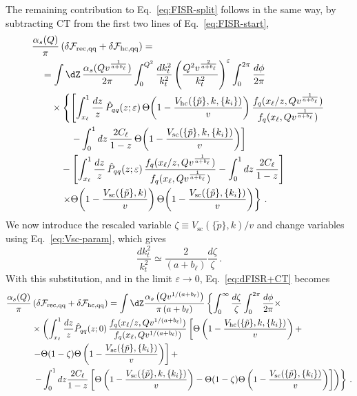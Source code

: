 The remaining contribution to Eq.~\eqref{eq:FISR-split} follows in the
same way, by subtracting $\mathrm{CT}$ from the first two lines of
Eq.~\eqref{eq:FISR-start},
\begin{align}
&\frac{\alpha_s(Q)}{\pi}\left(\delta \mathcal{F}_{\mathrm{rec,qq}}+\delta \mathcal{F}_{\mathrm{hc,qq}}\right)=\nonumber\\
&\quad=\int \dZ\,
  \frac{\alpha_s(Qv^{\frac{1}{a+b_\ell}})}{2\pi} \int_0^{Q^2}\frac{dk_t^2}{k_t^2}
\left(\frac{Q^2v^{\frac{2}{a+b_\ell}}}{k_t^2}\right)^{\varepsilon} \int_0^{2\pi}\frac{d\phi}{2\pi}\nonumber\\
&\qquad\times \left\{\left[\int_{x_\ell}^1 \frac{dz}{z}\,
\hat P_{qq}(z;\varepsilon)\,
\Theta\!\left(1-\frac{V_{\mathrm{hc}}(\{\tilde{p}\},k,\{k_i\})}{v}\right)
\frac{f_q(x_\ell/z,Qv^{\frac{1}{a+b_\ell}})}{f_q(x_\ell,Qv^{\frac{1}{a+b_\ell}})}\right.\right.\nonumber\\
&\qquad\qquad\left.
  - \int_0^1 dz\, \frac{2C_\ell}{1-z}\,
\Theta\!\left(1-\frac{V_{\mathrm{sc}}(\{\tilde{p}\},k,\{k_i\})}{v}\right)\right]\nonumber\\
&\qquad\quad-\left[\int_{x_\ell}^1\frac{dz}{z}\, \hat P_{qq}(z;\varepsilon)\,
\frac{f_q(x_\ell/z,Qv^{\frac{1}{a+b_\ell}})}{f_q(x_\ell,Qv^{\frac{1}{a+b_\ell}})}
-\int_0^1dz\,\frac{2 C_\ell}{1-z}\right]\nonumber\\
&\qquad\quad\left.\times\Theta\!\left(1-\frac{V_{\mathrm{sc}}(\{\tilde{p}\},k)}{v}\right)
\Theta\!\left(1-\frac{V_{\mathrm{sc}}(\{\tilde{p}\},\{k_i\})}{v}\right)
\right\}\,. \label{eq:dFISR+CT}
\end{align}
We now introduce the rescaled variable $\zeta \equiv
V_{\mathrm{sc}}(\{\tilde{p}\},k)/v$ and change variables using
Eq.~\eqref{eq:Vsc-param}, which gives
\begin{equation}
	\frac{dk_t^2}{k_t^2}\simeq\frac{2}{\left(a+b_\ell\right)}\frac{d\zeta}{\zeta}\,.
\end{equation}
With this substitution, and in the limit $\varepsilon \to 0$,
Eq.~\eqref{eq:dFISR+CT} becomes
\begin{equation}
  \begin{aligned}
    \label{eq:dFrec+dFhq}
\frac{\alpha_s(Q)}{\pi}&\left(\delta \mathcal{F}_{\mathrm{rec,qq}}+\delta \mathcal{F}_{\mathrm{hc,qq}}\right)=\int \dZ \frac{\alpha_s\left(Qv^{1/(a+b_\ell)}\right)}{\pi\left(a+b_\ell\right)}\left\{\int_0^\infty\frac{d\zeta}{\zeta}\int_0^{2\pi}\frac{d\phi}{2\pi}\times\right. \\
&\times \left(\int_{x_\ell}^1 \frac{dz}{z} \hat P_{qq}(z;0)\,\frac{f_q(x_\ell/z,Qv^{1/(a+b_\ell)})}{f_q(x_\ell,Qv^{1/(a+b_\ell)})}
\left[\Theta\left(1-\frac{V_{\mathrm{hc}}(\{\tilde{p}\},k,\{k_i\})}{v}\right)+\right.\right.\\
&\left.-\Theta(1-\zeta)\Theta\left(1-\frac{V_{\mathrm{sc}}(\{\tilde{p}\},\{k_i\})}{v}\right)\right] +\\
&\left.\left.-\int_0^1 dz \frac{2C_\ell}{1-z}\left[\Theta\left(1-\frac{V_{\mathrm{sc}}(\{\tilde{p}\},k,\{k_i\})}{v}\right) -\Theta(1-\zeta)\Theta\left(1-\frac{V_{\mathrm{sc}}(\{\tilde{p}\},\{k_i\})}{v}\right)\right]\right)\right\}\,.
\end{aligned}
\end{equation}
